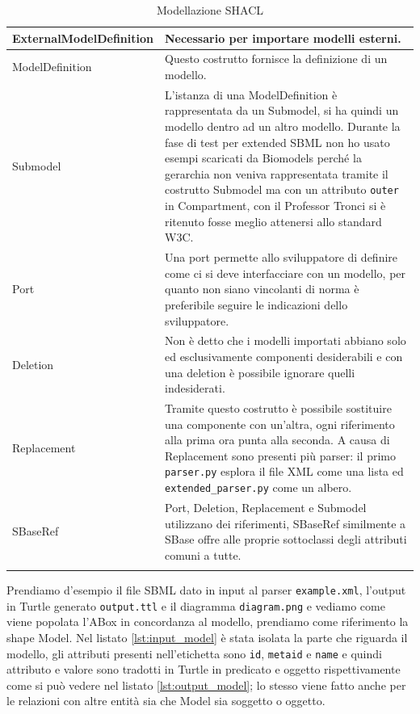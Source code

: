 \documentclass{article}
\begin{document}
\begin{longtable}{p{}p{}}
    \hline
    ExternalModelDefinition &  Necessario per importare modelli esterni. \\
    \hline
    ModelDefinition & Questo costrutto fornisce la definizione di un modello. \\ 
    \hline
    Submodel & L'istanza di una ModelDefinition è rappresentata da un Submodel, si ha quindi un modello dentro ad un altro modello. Durante la fase di test per extended SBML non ho usato esempi scaricati da Biomodels perché la gerarchia non veniva rappresentata tramite il costrutto Submodel ma con un attributo \texttt{outer} in Compartment, con il Professor Tronci si è ritenuto fosse meglio attenersi allo standard W3C. \\ 
    \hline
    Port & Una port permette allo sviluppatore di definire come ci si deve interfacciare con un modello, per quanto non siano vincolanti di norma è preferibile seguire le indicazioni dello sviluppatore. \\ 
    \hline
    Deletion & Non è detto che i modelli importati abbiano solo ed esclusivamente componenti desiderabili e con una deletion è possibile ignorare quelli indesiderati. \\
    \hline
    Replacement & Tramite questo costrutto è possibile sostituire una componente con un'altra, ogni riferimento alla prima ora punta alla seconda. A causa di Replacement sono presenti più parser: il primo \texttt{parser.py} esplora il file XML come una lista ed \texttt{extended\_parser.py} come un albero. \\
    \hline
    SBaseRef & Port, Deletion, Replacement e Submodel utilizzano dei riferimenti, SBaseRef similmente a SBase offre alle proprie sottoclassi degli attributi comuni a tutte. \\
    \hline

    \caption{Modellazione SHACL}
    \label{tab:modellazione}
\end{longtable}

Prendiamo d'esempio il file SBML dato in input al parser \texttt{example.xml}, l'output in Turtle generato \texttt{output.ttl} e il diagramma \texttt{diagram.png} e vediamo come viene popolata l'ABox in concordanza al modello, prendiamo come riferimento la shape Model. Nel listato \ref{lst:input_model} è stata isolata la parte che riguarda il modello, gli attributi presenti nell'etichetta sono \texttt{id}, \texttt{metaid} e \texttt{name} e quindi attributo e valore sono tradotti in Turtle in predicato e oggetto rispettivamente come si può vedere nel listato \ref{lst:output_model}; lo stesso viene fatto anche per le relazioni con altre entità sia che Model sia soggetto o oggetto. 
\end{document}
